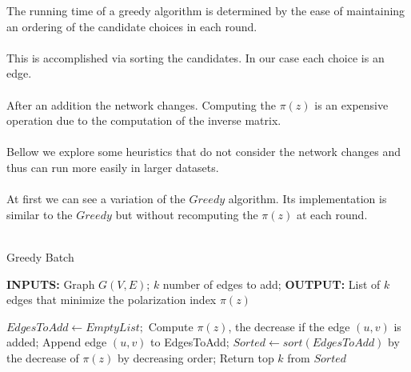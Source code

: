 The running time of a greedy algorithm is determined by the ease of maintaining an ordering of the candidate choices in each round. 
\\
\\
This is accomplished via sorting the candidates. In our case each choice is an edge. 
\\
\\
After an addition the network changes. Computing the $\pi(z)$ is an expensive operation due to the computation of the inverse matrix.
\\
\\
Bellow we explore some heuristics that do not consider the network changes and thus can run more easily in larger datasets.
\\
\\
At first we can see a variation of the $Greedy$ algorithm. Its implementation is similar to the $Greedy$ but without recomputing the  $\pi(z)$ at each round.
\\
\\
\begin{algorithm}[H]
		
			\caption{Greedy Batch}
			\label{alg:greedyBatch}
			
			\begin{flushleft}
        				\textbf{INPUTS:} Graph $G(V, E)$; $k$ number of edges to add;
				\vspace{6pt}
        				\textbf{OUTPUT:} List of $k$ edges that minimize the polarization index $\pi(z)$
			\end{flushleft}
			
			\begin{algorithmic}[1]
				\STATE $EdgesToAdd \leftarrow Empty List;$
					\STATE Compute $\pi(z)$, the decrease if the edge $(u,v)$ is added;
					\STATE Append edge $(u,v)$ to EdgesToAdd;
				\ENDFOR
				\STATE $Sorted \leftarrow sort(EdgesToAdd)$ by the decrease of $\pi(z)$ by decreasing order;
				\STATE Return top $k$ from $Sorted$
			\end{algorithmic}
			
		\end{algorithm}


